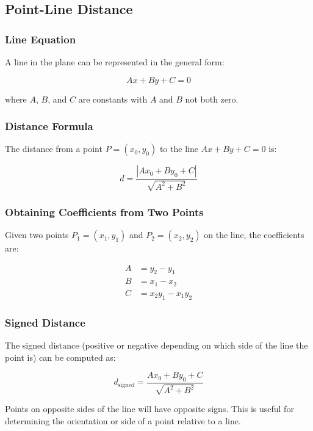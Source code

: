 \subsection{Point-Line Distance}

\subsubsection{Line Equation}

A line in the plane can be represented in the general form:

\begin{equation}
    Ax + By + C = 0
\end{equation}

where $A$, $B$, and $C$ are constants with $A$ and $B$ not both zero.

\subsubsection{Distance Formula}

The distance from a point $P = (x_0, y_0)$ to the line $Ax + By + C = 0$ is:

\begin{equation}
    d = \frac{|Ax_0 + By_0 + C|}{\sqrt{A^2 + B^2}}
\end{equation}

\subsubsection{Obtaining Coefficients from Two Points}

Given two points $P_1 = (x_1, y_1)$ and $P_2 = (x_2, y_2)$ on the line, the coefficients are:

\begin{align}
    A &= y_2 - y_1 \\
    B &= x_1 - x_2 \\
    C &= x_2 y_1 - x_1 y_2
\end{align}

\subsubsection{Signed Distance}

The signed distance (positive or negative depending on which side of the line the point is) can be computed as:

\begin{equation}
    d_{\text{signed}} = \frac{Ax_0 + By_0 + C}{\sqrt{A^2 + B^2}}
\end{equation}

Points on opposite sides of the line will have opposite signs. This is useful for determining the orientation or side of a point relative to a line.
